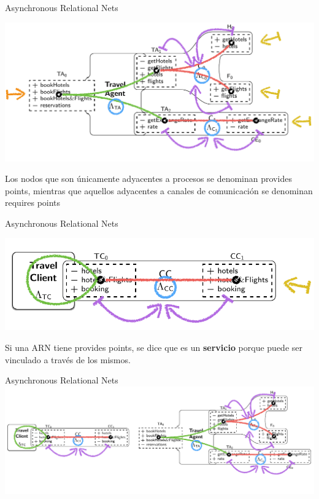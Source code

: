 \documentclass[10pt,xcolor={table,dvipsnames},t]{beamer}
\begin{document}
\begin{frame}{Asynchronous Relational Nets \cite{fiadeiro:fase2011}}
\begin{center}
\includegraphics[scale=0.5]{images/ARN4.png}
\end{center}
Los nodos que son únicamente adyacentes a \textcolor{proc}{procesos} se denominan \textcolor{prov}{provides points}, mientras que aquellos adyacentes a \textcolor{com}{canales de comunicación} se denominan \textcolor{req}{requires points}  
\end{frame}

\begin{frame}{Asynchronous Relational Nets \cite{fiadeiro:fase2011}}
\begin{center}
\includegraphics[scale=0.5]{images/ARN5.png}
\end{center}
Si una ARN tiene \textcolor{prov}{provides points}, se dice que es un \textbf{servicio} porque puede ser vinculado a través de los mismos.
\end{frame}

\begin{frame}{Asynchronous Relational Nets \cite{fiadeiro:fase2011}}
\includegraphics[scale=0.45]{images/ARN6.png}
\end{frame}
\end{document}
